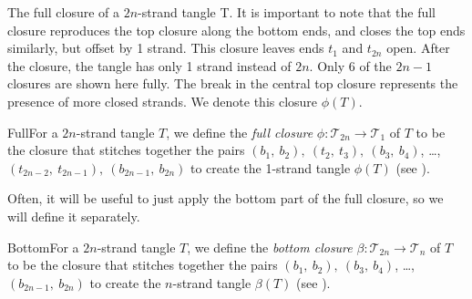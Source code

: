 \begin{paper}
{The full closure of a $2n$-strand tangle T.
It is important to note that the full closure reproduces the top closure along
the bottom ends, and closes the top ends similarly, but offset by 1 strand.
This closure leaves ends $t_1$ and $t_{2n}$ open.
After the closure, the tangle has only 1 strand instead of $2n$.
Only 6 of the $2n-1$ closures are shown here fully.
The break in the central top closure represents the presence of more closed
strands.
We denote this closure $\phi(T)$.}

\begin{paperdef}{Full}{For a $2n$-strand tangle $T$, we define the
\textit{full closure} $\phi:\mathcal{T}_{2n}\to\mathcal{T}_1$ of $T$ to be the
closure that stitches together the pairs $(b_1,~b_2),~(t_2,~t_3),~(b_3,~b_4)$,
\dots, $(t_{2n-2},~t_{2n-1}),~(b_{2n-1},~b_{2n})$ to create the 1-strand tangle
$\phi(T)$ (see \figFull).}\end{paperdef}

Often, it will be useful to just apply the bottom part of the full closure, so
we will define it separately.

\begin{paperdef}{Bottom}{For a $2n$-strand tangle $T$, we define the
\textit{bottom closure} $\beta:\mathcal{T}_{2n}\to\mathcal{T}_n$ of $T$ to be
the closure that stitches together the pairs $(b_1,~b_2),~(b_3,~b_4)$, \dots,
$(b_{2n-1},~b_{2n})$ to create the $n$-strand tangle $\beta(T)$ (see \figFull).}
\end{paperdef}


\end{paper}
